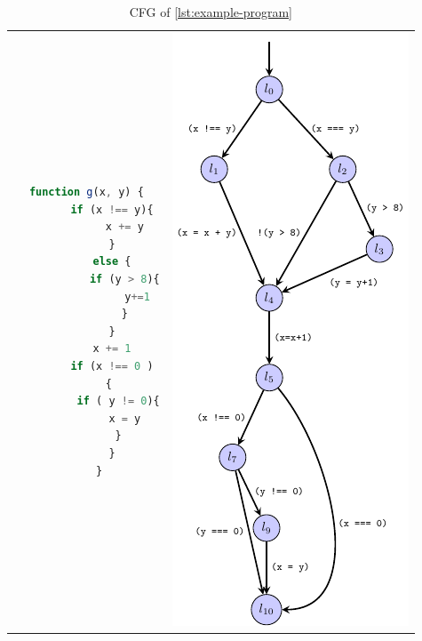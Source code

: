 \begin{table}[t]
  
\begin{tabular*}{\textwidth}{@{}c|c@{}}
\begin{minipage}{\dimexpr0.5\textwidth-2\tabcolsep}
\centering
\begin{lstlisting}[language=JavaScript, label={lst:example-program}, caption={A simple program}]
    function g(x, y) {
        if (x !== y){
            x += y
        }
        else {
            if (y > 8){
                y+=1
            }
        }
        x += 1
        if (x !== 0 )
        { 
          if ( y != 0){
            x = y
          }
        }
    }
\end{lstlisting}
   
\end{minipage}
&
\begin{minipage}{\dimexpr0.5\textwidth-2\tabcolsep}
\centering
     \includegraphics{../luatex/cfg/out/cfg.pdf}
     \caption{CFG of \autoref{lst:example-program}}
    \label{fig:example-program-graph}
\end{minipage}
\\
\end{tabular*}
\end{table}

